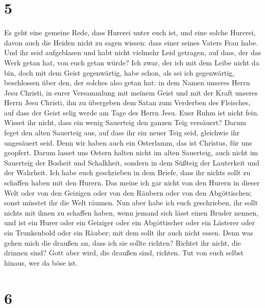 \hypertarget{section-4}{%
\section{5}\label{section-4}}

 Es geht eine gemeine Rede, dass Hurerei unter euch ist,
und eine solche Hurerei, davon auch die Heiden nicht zu sagen wissen:
dass einer seines Vaters Frau habe.  Und ihr seid
aufgeblasen und habt nicht vielmehr Leid getragen, auf dass, der das
Werk getan hat, von euch getan würde?  Ich zwar, der ich
mit dem Leibe nicht da bin, doch mit dem Geist gegenwärtig, habe schon,
als sei ich gegenwärtig, beschlossen über den, der solches also getan
hat:  in dem Namen unseres Herrn Jesu Christi, in eurer
Versammlung mit meinem Geist und mit der Kraft unseres Herrn Jesu
Christi,  ihn zu übergeben dem Satan zum Verderben des
Fleisches, auf dass der Geist selig werde am Tage des Herrn Jesu.
 Euer Ruhm ist nicht fein. Wisset ihr nicht, dass ein
wenig Sauerteig den ganzen Teig versäuert?  Darum feget
den alten Sauerteig aus, auf dass ihr ein neuer Teig seid, gleichwie ihr
ungesäuert seid. Denn wir haben auch ein Osterlamm, das ist Christus,
für uns geopfert.  Darum lasset uns Ostern halten nicht im
alten Sauerteig, auch nicht im Sauerteig der Bosheit und Schalkheit,
sondern in dem Süßteig der Lauterkeit und der Wahrheit. 
Ich habe euch geschrieben in dem Briefe, dass ihr nichts sollt zu
schaffen haben mit den Hurern.  Das meine ich gar nicht
von den Hurern in dieser Welt oder von den Geizigen oder von den Räubern
oder von den Abgöttischen; sonst müsstet ihr die Welt räumen.
 Nun aber habe ich euch geschrieben, ihr sollt nichts mit
ihnen zu schaffen haben, wenn jemand sich lässt einen Bruder nennen, und
ist ein Hurer oder ein Geiziger oder ein Abgöttischer oder ein Lästerer
oder ein Trunkenbold oder ein Räuber; mit dem sollt ihr auch nicht
essen.  Denn was gehen mich die draußen an, dass ich sie
sollte richten? Richtet ihr nicht, die drinnen sind? 
Gott aber wird, die draußen sind, richten. Tut von euch selbst hinaus,
wer da böse ist.

\hypertarget{section-5}{%
\section{6}\label{section-5}}

